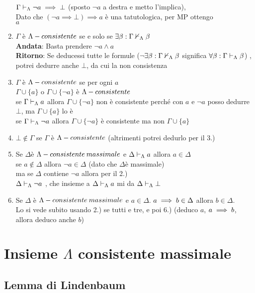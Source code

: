 \begin{enumerate}
 $\Gamma\vdash_{\Lambda}\neg a\implies\bot$ (sposto $\neg a$ a destra
e metto l'implica), \\
 Dato che $(\neg a\implies\bot)\implies a$ è una tatutologica, per
MP ottengo\\
 $a$ 
\item $\Gamma$ è $ $$\mbox{\ensuremath{\Lambda}}-consistente$ se e solo se $\exists\beta:\Gamma\nvdash_{\Lambda}\beta$
\\
 \textbf{Andata}: Basta prendere $\neg a\wedge a$\\
 \textbf{Ritorno}: Se deducessi tutte le formule ($\neg$$\exists\beta:\Gamma\nvdash_{\Lambda}\beta$
significa $\forall\beta:\Gamma\vdash_{\Lambda}\beta$) , potrei dedurre anche
$\bot$, da cui la non consistenza 
\item $\Gamma$ è $\mbox{\ensuremath{\Lambda}}-consistente$ se per ogni $a$ \\
 $\Gamma\cup\{a\}$ o $\Gamma\cup\{\neg a\}$ è $\mbox{\ensuremath{\Lambda}}-consistente$\\
 se $\Gamma\vdash_{\Lambda}a$ allora $ $$\Gamma\cup\{\neg a\}$ non è consistente
perché con $a$ e $\neg a$ posso dedurre $\bot$, ma $\Gamma\cup\{a\}$
lo è \\
 se $\Gamma\vdash_{\Lambda}\neg a$ allora $ $$\Gamma\cup\{\neg a\}$ è
consistente ma non $\Gamma\cup\{a\}$ 
\item $\bot$$\notin\Gamma$ se $\Gamma$ è $\mbox{\ensuremath{\Lambda}}-consistente$ (altrimenti potrei
dedurlo per il 3.) 
\item Se $\Delta$è $\mbox{\ensuremath{\Lambda}}-consistente\: massimale$ e $\Delta\vdash_{\Lambda}a$ allora
$a\in\Delta$\\
 se $a\notin\Delta$ allora $\neg a\in\Delta$ (dato che $\Delta$è
massimale) \\
 ma se $\Delta$ contiene $\neg a$ allora per il 2.)\\
 $\Delta\vdash_{\Lambda}\neg a$ , che insieme a $\Delta\vdash_{\Lambda}a$ mi
da $\Delta\vdash_{\Lambda}\bot$ 
\item Se $\Delta$ è $\Lambda-consistente\: massimale$ e $ $$a\in\Delta$. $a\implies b\in\Delta$
allora $b\in\Delta$. \\
 Lo si vede subito usando 2.) se tutti e tre, e poi 6.) (deduco $a$,
$a\implies b$, allora deduco anche $b$) 
\end{enumerate}

\section{Insieme $\Lambda$ consistente massimale}


\subsection{Lemma di Lindenbaum}

